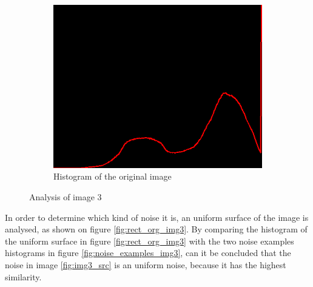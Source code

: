 \begin{figure}[H]
\begin{subfigure}[b]{0.485\textwidth}
        \includegraphics[width=\textwidth]{img3/hist_org_img3.png}
        \caption{Histogram of the original image}
        \label{fig:img3_hist}
    \end{subfigure}
    \caption{Analysis of image 3}
    \label{fig:img3}
\end{figure}
In order to determine which kind of noise it is, an uniform surface of the image is analysed, as shown on figure \ref{fig:rect_org_img3}. By comparing the histogram of the uniform surface in figure \ref{fig:rect_org_img3} with the two noise examples histograms in figure \ref{fig:noise_examples_img3}, can it be concluded that the noise in image \ref{fig:img3_src} is an uniform noise, because it has the highest similarity.

